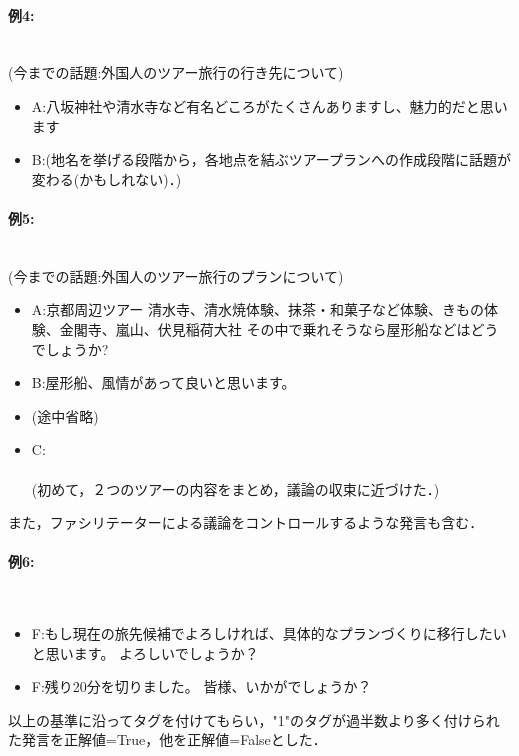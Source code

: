 \paragraph{例4:}\ \\
(今までの話題:外国人のツアー旅行の行き先について)
\begin{itemize}
\item A:八坂神社や清水寺など有名どころがたくさんありますし、魅力的だと思います
\item B:(地名を挙げる段階から，各地点を結ぶツアープランへの作成段階に話題が変わる(かもしれない)．)
\end{itemize}

\paragraph{例5:}\ \\
(今までの話題:外国人のツアー旅行のプランについて)
\begin{itemize}
\item A:京都周辺ツアー
 清水寺、清水焼体験、抹茶・和菓子など体験、きもの体験、金閣寺、嵐山、伏見稲荷大社
 その中で乗れそうなら屋形船などはどうでしょうか?
\item B:屋形船、風情があって良いと思います。
\item (途中省略)
\item C: 
 \\
 \\
 (初めて，２つのツアーの内容をまとめ，議論の収束に近づけた．)
 \end{itemize}
また，ファシリテーターによる議論をコントロールするような発言も含む．
\paragraph{例6:}\ \\
\begin{itemize}
\item F:もし現在の旅先候補でよろしければ、具体的なプランづくりに移行したいと思います。
 よろしいでしょうか？
\item F:残り20分を切りました。
 皆様、いかがでしょうか？
\end{itemize}
以上の基準に沿ってタグを付けてもらい，"1"のタグが過半数より多く付けられた発言を正解値=True，他を正解値=Falseとした．

